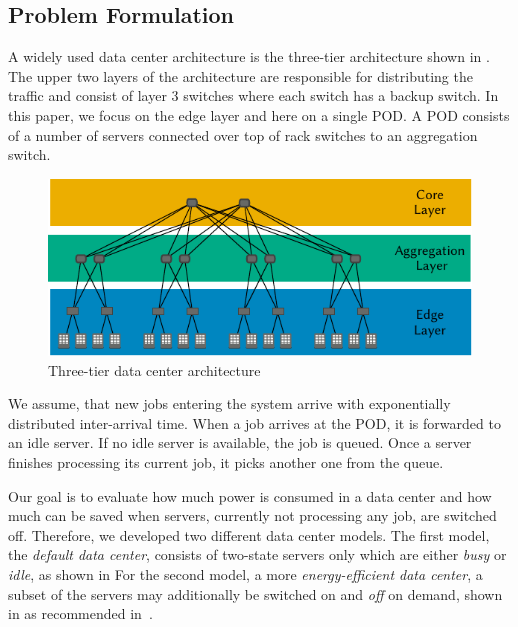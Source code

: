 \subsection{Problem Formulation}\label{sec:cloud:data_centers:problem_formulation}

A widely used data center architecture is the three-tier architecture shown in .
The upper two layers of the architecture are responsible for distributing the traffic and consist of layer 3 switches where each switch has a backup switch.
In this paper, we focus on the edge layer and here on a single \gls{POD}.
A \gls{POD} consists of a number of servers connected over top of rack switches to an aggregation switch.

\begin{figure}
  \centering
  \includegraphics{cloud/data_centers/problem_formulation/figures/architecture}
  \caption{Three-tier data center architecture}
  \label{fig:cloud:data_centers:problem_formulation:3-tier_datacenter}
\end{figure}


We assume, that new jobs entering the system arrive with exponentially distributed inter-arrival time.
When a job arrives at the \gls{POD}, it is forwarded to an idle server.
If no idle server is available, the job is queued.
Once a server finishes processing its current job, it picks another one from the queue.

Our goal is to evaluate how much power is consumed in a data center and how much can be saved when servers, currently not processing any job, are switched off.
Therefore, we developed two different data center models.
The first model, the \emph{default data center}, consists of two-state servers only which are either \emph{busy} or \emph{idle}, as shown in  
For the second model, a more \emph{energy-efficient data center}, a subset of the servers may additionally be switched on and \emph{off} on demand, shown in  as recommended in~\cite{EPA2007}.

